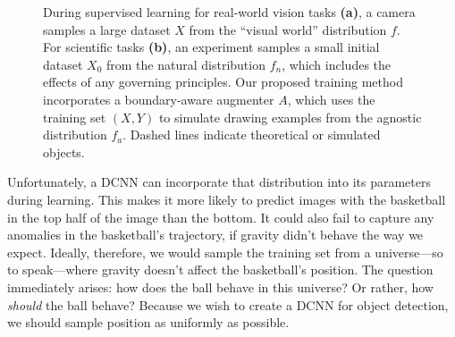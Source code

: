 \documentclass[10pt, draftcls]{IEEEtran}
\begin{document}

\begin{figure}
  \centering
  \hfill
  \caption{During supervised learning for real-world vision tasks \textbf{(a)},
    a camera samples a large dataset $X$ from the ``visual world'' distribution
    $f$. For scientific tasks \textbf{(b)}, an experiment samples a small
    initial dataset $X_0$ from the natural distribution $f_n$, which includes
    the effects of any governing principles. Our proposed training method
    incorporates a boundary-aware augmenter $A$, which uses the training set
    $(X,Y)$ to simulate drawing examples from the agnostic distribution
    $f_a$. Dashed lines indicate theoretical or simulated objects.}
  \label{fig:dependency-graphs}
\end{figure}

Unfortunately, a DCNN can incorporate that distribution into its parameters
during learning. This makes it more likely to predict images with the basketball
in the top half of the image than the bottom. It could also fail to capture any
anomalies in the basketball's trajectory, if gravity didn't behave the way we
expect. Ideally, therefore, we would sample the training set from a
universe---so to speak---where gravity doesn't affect the basketball's
position. The question immediately arises: how does the ball behave in this
universe? Or rather, how \emph{should} the ball behave? Because we wish to
create a DCNN for object detection, we should sample position as uniformly as
possible.
\end{document}
